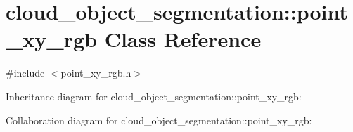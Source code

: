 \hypertarget{classcloud__object__segmentation_1_1point__xy__rgb}{}\section{cloud\+\_\+object\+\_\+segmentation\+:\+:point\+\_\+xy\+\_\+rgb Class Reference}
\label{classcloud__object__segmentation_1_1point__xy__rgb}


{\ttfamily \#include $<$point\+\_\+xy\+\_\+rgb.\+h$>$}



Inheritance diagram for cloud\+\_\+object\+\_\+segmentation\+:\+:point\+\_\+xy\+\_\+rgb\+:


Collaboration diagram for cloud\+\_\+object\+\_\+segmentation\+:\+:point\+\_\+xy\+\_\+rgb\+:
